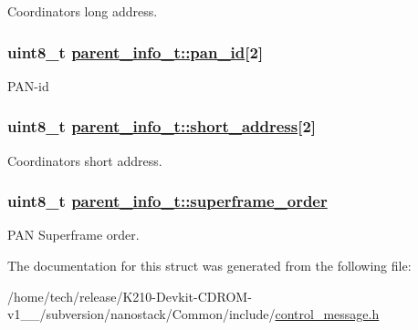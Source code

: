 Coordinators long address. \hypertarget{structparent__info__t_2138f2dfdfb2427df926d5afa8325408}{
\subsubsection[pan\_\-id]{\setlength{\rightskip}{0pt plus 5cm}uint8\_\-t \hyperlink{structparent__info__t_2138f2dfdfb2427df926d5afa8325408}{parent\_\-info\_\-t::pan\_\-id}\mbox{[}2\mbox{]}}}
\label{structparent__info__t_2138f2dfdfb2427df926d5afa8325408}


PAN-id \hypertarget{structparent__info__t_463aef8b654047f66e65fbeaa0d7d998}{
\subsubsection[short\_\-address]{\setlength{\rightskip}{0pt plus 5cm}uint8\_\-t \hyperlink{structparent__info__t_463aef8b654047f66e65fbeaa0d7d998}{parent\_\-info\_\-t::short\_\-address}\mbox{[}2\mbox{]}}}
\label{structparent__info__t_463aef8b654047f66e65fbeaa0d7d998}


Coordinators short address. \hypertarget{structparent__info__t_1051ff5dc2cd27378496f5d4beb1ed1a}{
\subsubsection[superframe\_\-order]{\setlength{\rightskip}{0pt plus 5cm}uint8\_\-t \hyperlink{structparent__info__t_1051ff5dc2cd27378496f5d4beb1ed1a}{parent\_\-info\_\-t::superframe\_\-order}}}
\label{structparent__info__t_1051ff5dc2cd27378496f5d4beb1ed1a}


PAN Superframe order. 

The documentation for this struct was generated from the following file:\begin{CompactItemize}
\item 
/home/tech/release/K210-Devkit-CDROM-v1\_\_/subversion/nanostack/Common/include/\hyperlink{control__message_8h}{control\_\-message.h}\end{CompactItemize}
